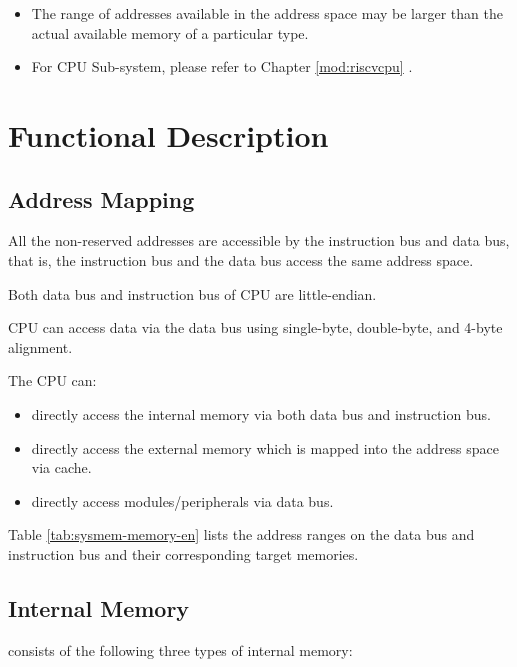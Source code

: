 \documentclass[main\_\_EN.tex]{subfiles}
\begin{document}
\begin{tiplisting}
\vspace{-2em}
\begin{itemize}
    \item The range of addresses available in the address space may be larger than the actual available memory of a particular type.
    \item For CPU Sub-system, please refer to Chapter \ref{mod:riscvcpu} \textit{}.
\end{itemize}
\end{tiplisting}

\section{Functional Description}

\subsection{Address Mapping}

All the non-reserved addresses are accessible by the instruction bus and data bus, that is, the instruction bus and the data bus access the same address space.

Both data bus and instruction bus of CPU are little-endian.

CPU can access data via the data bus using single-byte, double-byte, and 4-byte alignment.

The CPU can:
\begin{itemize}
\item directly access the internal memory via both data bus and instruction bus.
\item directly access the external memory which is mapped into the address space via cache.
\item directly access modules/peripherals via data bus.
\end{itemize}

Table \ref{tab:sysmem-memory-en} lists the address ranges on the data bus and instruction bus and their corresponding target memories.




\subsection{Internal Memory}
\label{para:sysmem-internal-memory}

\chipname{} consists of the following three types of internal memory:
\end{document}

